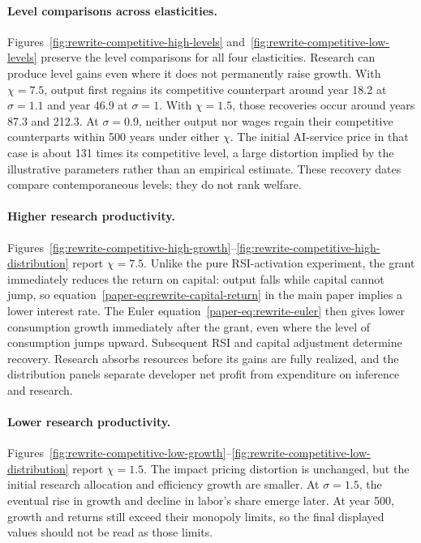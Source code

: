 \paragraph{Level comparisons across elasticities.}
Figures~\ref{fig:rewrite-competitive-high-levels}
and~\ref{fig:rewrite-competitive-low-levels} preserve the level comparisons
for all four elasticities. Research can produce level gains even where it
does not permanently raise growth. With $\chi=7.5$, output first regains
its competitive counterpart around year 18.2 at $\sigma=1.1$ and year 46.9
at $\sigma=1$. With $\chi=1.5$, those recoveries occur around years 87.3
and 212.3. At $\sigma=0.9$, neither output nor wages regain their
competitive counterparts within 500 years under either $\chi$.
The initial AI-service price in that case is about 131 times its competitive
level, a large distortion implied by the illustrative parameters rather
than an empirical estimate. These recovery dates compare contemporaneous
levels; they do not rank welfare.

\paragraph{Higher research productivity.}
Figures~\ref{fig:rewrite-competitive-high-growth}--\ref{fig:rewrite-competitive-high-distribution}
report $\chi=7.5$. Unlike the pure RSI-activation experiment, the grant
immediately reduces the return on capital: output falls while capital
cannot jump, so equation~\eqref{paper-eq:rewrite-capital-return} in the main paper implies a
lower interest rate. The Euler equation~\eqref{paper-eq:rewrite-euler}
then gives lower consumption growth immediately after the grant,
even where the level of consumption jumps upward. Subsequent RSI
and capital adjustment determine recovery. Research absorbs resources
before its gains are fully realized, and the distribution panels
separate developer net profit from expenditure on inference and research.

\paragraph{Lower research productivity.}
Figures~\ref{fig:rewrite-competitive-low-growth}--\ref{fig:rewrite-competitive-low-distribution}
report $\chi=1.5$. The impact pricing distortion is unchanged, but
the initial research allocation and efficiency growth are smaller.
At $\sigma=1.5$, the eventual rise in growth and decline in labor's
share emerge later. At year 500, growth and returns still exceed
their monopoly limits, so the final displayed values should not be
read as those limits.

